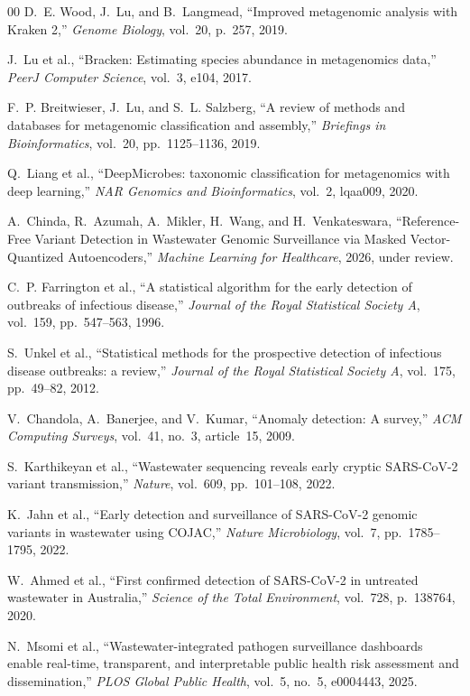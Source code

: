 \documentclass[conference]{IEEEtran}
\begin{document}
\begin{thebibliography}{00}
D.~E. Wood, J.~Lu, and B.~Langmead, ``Improved metagenomic analysis with
Kraken 2,'' \textit{Genome Biology}, vol.~20, p.~257, 2019.

J.~Lu et al., ``Bracken: Estimating species abundance in metagenomics data,''
\textit{PeerJ Computer Science}, vol.~3, e104, 2017.

F.~P. Breitwieser, J.~Lu, and S.~L. Salzberg, ``A review of methods and
databases for metagenomic classification and assembly,''
\textit{Briefings in Bioinformatics}, vol.~20, pp.~1125--1136, 2019.

Q.~Liang et al., ``DeepMicrobes: taxonomic classification for metagenomics
with deep learning,''
\textit{NAR Genomics and Bioinformatics}, vol.~2, lqaa009, 2020.

A.~Chinda, R.~Azumah, A.~Mikler, H.~Wang, and H.~Venkateswara,
``Reference-Free Variant Detection in Wastewater Genomic Surveillance
via Masked Vector-Quantized Autoencoders,''
\textit{Machine Learning for Healthcare}, 2026, under review.

C.~P. Farrington et al., ``A statistical algorithm for the early detection
of outbreaks of infectious disease,''
\textit{Journal of the Royal Statistical Society A}, vol.~159, pp.~547--563, 1996.

S.~Unkel et al., ``Statistical methods for the prospective detection of
infectious disease outbreaks: a review,''
\textit{Journal of the Royal Statistical Society A}, vol.~175, pp.~49--82, 2012.

V.~Chandola, A.~Banerjee, and V.~Kumar, ``Anomaly detection: A survey,''
\textit{ACM Computing Surveys}, vol.~41, no.~3, article~15, 2009.

S.~Karthikeyan et al., ``Wastewater sequencing reveals early cryptic
SARS-CoV-2 variant transmission,'' \textit{Nature}, vol.~609, pp.~101--108, 2022.

K.~Jahn et al., ``Early detection and surveillance of SARS-CoV-2 genomic
variants in wastewater using COJAC,''
\textit{Nature Microbiology}, vol.~7, pp.~1785--1795, 2022.

W.~Ahmed et al., ``First confirmed detection of SARS-CoV-2 in untreated
wastewater in Australia,''
\textit{Science of the Total Environment}, vol.~728, p.~138764, 2020.

N.~Msomi et al., ``Wastewater-integrated pathogen surveillance dashboards
enable real-time, transparent, and interpretable public health risk
assessment and dissemination,'' \textit{PLOS Global Public Health}, vol.~5,
no.~5, e0004443, 2025.


\end{thebibliography}
\end{document}
